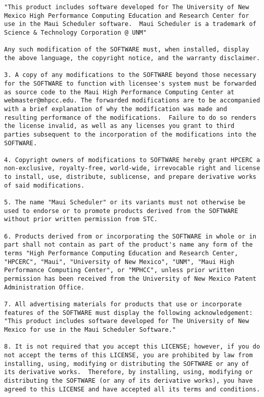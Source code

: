 \begin{verbatim}
"This product includes software developed for The University of New
Mexico High Performance Computing Education and Research Center for
use in the Maui Scheduler software.  Maui Scheduler is a trademark of
Science & Technology Corporation @ UNM"

Any such modification of the SOFTWARE must, when installed, display
the above language, the copyright notice, and the warranty disclaimer.

3. A copy of any modifications to the SOFTWARE beyond those necessary
for the SOFTWARE to function with licensee's system must be forwarded
as source code to the Maui High Performance Computing Center at
webmaster@mhpcc.edu. The forwarded modifications are to be accompanied
with a brief explanation of why the modification was made and
resulting performance of the modifications.  Failure to do so renders
the license invalid, as well as any licenses you grant to third
parties subsequent to the incorporation of the modifications into the
SOFTWARE.

4. Copyright owners of modifications to SOFTWARE hereby grant HPCERC a
non-exclusive, royalty-free, world-wide, irrevocable right and license
to install, use, distribute, sublicense, and prepare derivative works
of said modifications.

5. The name "Maui Scheduler" or its variants must not otherwise be
used to endorse or to promote products derived from the SOFTWARE
without prior written permission from STC.

6. Products derived from or incorporating the SOFTWARE in whole or in
part shall not contain as part of the product's name any form of the
terms "High Performance Computing Education and Research Center,
"HPCERC", "Maui", "University of New Mexico", "UNM", "Maui High
Performance Computing Center", or "MPHCC", unless prior written
permission has been received from the University of New Mexico Patent
Administration Office.

7. All advertising materials for products that use or incorporate
features of the SOFTWARE must display the following acknowledgement:
"This product includes software developed for The University of New
Mexico for use in the Maui Scheduler Software."

8. It is not required that you accept this LICENSE; however, if you do
not accept the terms of this LICENSE, you are prohibited by law from
installing, using, modifying or distributing the SOFTWARE or any of
its derivative works.  Therefore, by installing, using, modifying or
distributing the SOFTWARE (or any of its derivative works), you have
agreed to this LICENSE and have accepted all its terms and conditions.


\end{verbatim}
